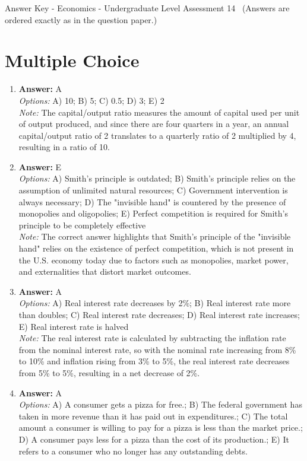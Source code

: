 \documentclass[12pt]{article}
\begin{document}
\begin{center}
Answer Key - Economics - Undergraduate Level Assessment 14 \
\small (Answers are ordered exactly as in the question paper.)
\end{center}

\section*{Multiple Choice}
\begin{enumerate}[label=\arabic*.]
\item \textbf{Answer:} A
\\ \textit{Options:} A) 10; B) 5; C) 0.5; D) 3; E) 2
\\ \textit{Note:} The capital/output ratio measures the amount of capital used per unit of output produced, and since there are four quarters in a year, an annual capital/output ratio of 2 translates to a quarterly ratio of 2 multiplied by 4, resulting in a ratio of 10.
\item \textbf{Answer:} E
\\ \textit{Options:} A) Smith's principle is outdated; B) Smith's principle relies on the assumption of unlimited natural resources; C) Government intervention is always necessary; D) The "invisible hand" is countered by the presence of monopolies and oligopolies; E) Perfect competition is required for Smith's principle to be completely effective
\\ \textit{Note:} The correct answer highlights that Smith's principle of the "invisible hand" relies on the existence of perfect competition, which is not present in the U.S. economy today due to factors such as monopolies, market power, and externalities that distort market outcomes.
\item \textbf{Answer:} A
\\ \textit{Options:} A) Real interest rate decreases by 2\%; B) Real interest rate more than doubles; C) Real interest rate decreases; D) Real interest rate increases; E) Real interest rate is halved
\\ \textit{Note:} The real interest rate is calculated by subtracting the inflation rate from the nominal interest rate, so with the nominal rate increasing from 8\% to 10\% and inflation rising from 3\% to 5\%, the real interest rate decreases from 5\% to 5\%, resulting in a net decrease of 2\%.
\item \textbf{Answer:} A
\\ \textit{Options:} A) A consumer gets a pizza for free.; B) The federal government has taken in more revenue than it has paid out in expenditures.; C) The total amount a consumer is willing to pay for a pizza is less than the market price.; D) A consumer pays less for a pizza than the cost of its production.; E) It refers to a consumer who no longer has any outstanding debts.

\end{enumerate}
\end{document}
